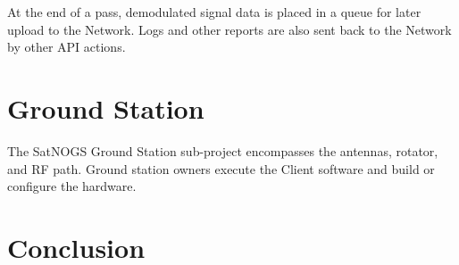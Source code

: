 \documentclass[conference]{IEEEtran}
\begin{document}
At the end of a pass, demodulated signal data is placed in a queue for later upload to the Network.
Logs and other reports are also sent back to the Network by other API actions.


\section{Ground Station}
The SatNOGS Ground Station sub-project encompasses the antennas, rotator, and RF path.
Ground station owners execute the Client software and build or configure the hardware.



\section{Conclusion}


\end{document}

